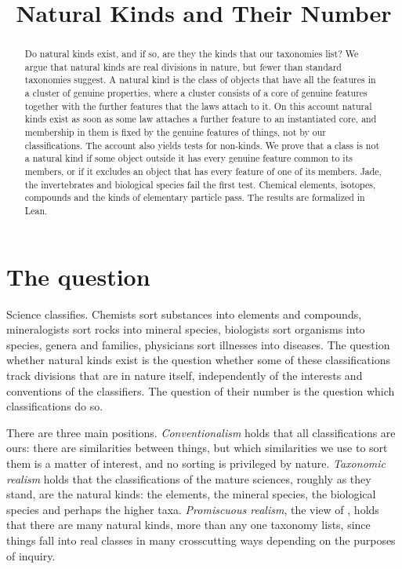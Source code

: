 \documentclass{situationist-preprint}
\title{Natural Kinds and Their Number}
\begin{document}
\maketitle

\begin{abstract}
Do natural kinds exist, and if so, are they the kinds that our taxonomies list? We argue that natural kinds are real divisions in nature, but fewer than standard taxonomies suggest. A natural kind is the class of objects that have all the features in a cluster of genuine properties, where a cluster consists of a core of genuine features together with the further features that the laws attach to it. On this account natural kinds exist as soon as some law attaches a further feature to an instantiated core, and membership in them is fixed by the genuine features of things, not by our classifications. The account also yields tests for non-kinds. We prove that a class is not a natural kind if some object outside it has every genuine feature common to its members, or if it excludes an object that has every feature of one of its members. Jade, the invertebrates and biological species fail the first test. Chemical elements, isotopes, compounds and the kinds of elementary particle pass. The results are formalized in Lean.
\end{abstract}

\section{The question}\label{s:question}

Science classifies. Chemists sort substances into elements and compounds, mineralogists sort rocks into mineral species, biologists sort organisms into species, genera and families, physicians sort illnesses into diseases. The question whether natural kinds exist is the question whether some of these classifications track divisions that are in nature itself, independently of the interests and conventions of the classifiers. The question of their number is the question which classifications do so.

There are three main positions. \emph{Conventionalism} holds that all classifications are ours: there are similarities between things, but which similarities we use to sort them is a matter of interest, and no sorting is privileged by nature. \emph{Taxonomic realism} holds that the classifications of the mature sciences, roughly as they stand, are the natural kinds: the elements, the mineral species, the biological species and perhaps the higher taxa. \emph{Promiscuous realism}, the view of \citet{Dupre1993}, holds that there are many natural kinds, more than any one taxonomy lists, since things fall into real classes in many crosscutting ways depending on the purposes of inquiry.
\end{document}
